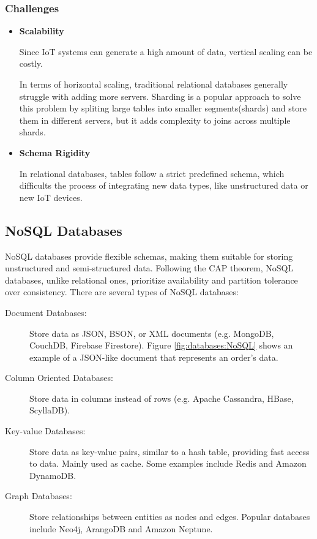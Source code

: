 \subsubsection{Challenges}
\begin{itemize}

	\item \textbf{Scalability}

	      Since \gls{IoT} systems can generate a high amount of data, vertical scaling can
	      be costly.

	      In terms of horizontal scaling, traditional relational databases generally
	      struggle with adding more servers. Sharding is a popular approach to
	      solve this problem by spliting large tables into smaller segments(shards)
	      and store them in different servers, but it adds complexity to joins
	      across multiple shards.

	\item \textbf{Schema Rigidity}

	      In relational databases, tables follow a strict predefined schema, which
	      difficults the process of integrating new data types, like unstructured
	      data or new \gls{IoT} devices.

\end{itemize}


\subsection{NoSQL Databases}
\gls{NoSQL} databases provide flexible schemas, making them suitable
for storing unstructured and semi-structured data. Following the \gls{CAP} theorem,
\gls{NoSQL} databases, unlike relational ones, prioritize availability and partition
tolerance over consistency. There are several types of \gls{NoSQL} databases:

\begin{description}

	\item[Document Databases: ]Store data as \gls{JSON}, \gls{BSON}, or \gls{XML} documents (e.g.
	      MongoDB, CouchDB, Firebase Firestore). Figure \ref{fig:databases:NoSQL}
	      shows an example of a \gls{JSON}-like document that represents an order's data.
	\item[Column Oriented Databases: ]Store data in columns instead of rows (e.g.
	      Apache Cassandra, HBase, ScyllaDB).
	\item[Key-value Databases: ]Store data as key-value pairs, similar to
	      a hash table, providing fast access to data. Mainly used as cache. Some
	      examples include Redis and Amazon DynamoDB.
	\item[Graph Databases: ]Store relationships between entities as nodes and
	      edges. Popular databases include Neo4j, ArangoDB and Amazon Neptune.

\end{description}

